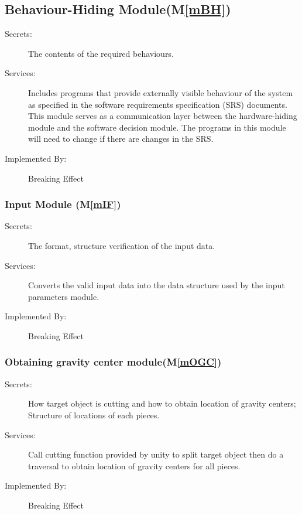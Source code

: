\documentclass[12pt, titlepage]{article}
\newcommand{\mref}[1]{M\ref{#1}}
\begin{document}
	\subsection{Behaviour-Hiding Module(\mref{mBH})}
	
	\begin{description}
		\item[Secrets:]The contents of the required behaviours.
		\item[Services:]Includes programs that provide externally visible behaviour of
		the system as specified in the software requirements specification (SRS)
		documents. This module serves as a communication layer between the
		hardware-hiding module and the software decision module. The programs in this
		module will need to change if there are changes in the SRS.
		\item[Implemented By:] Breaking Effect
	\end{description}
	
	\subsubsection{Input Module (\mref{mIF})}
	
	\begin{description}
		\item[Secrets:]The format, structure verification of the input data.
		\item[Services:]Converts the valid input data into the data structure used by the
		input parameters module. 
		\item[Implemented By:] Breaking Effect
	\end{description}
	
	\subsubsection{Obtaining gravity center module(\mref{mOGC})}
	
	\begin{description}
		\item[Secrets:]How target object is cutting and how to obtain location of gravity centers; Structure of locations of each pieces.
		\item[Services:]Call cutting function provided by unity to split target object then do a traversal to obtain location of gravity centers for all pieces.
		\item[Implemented By:] Breaking Effect
	\end{description}
	
\end{document}
